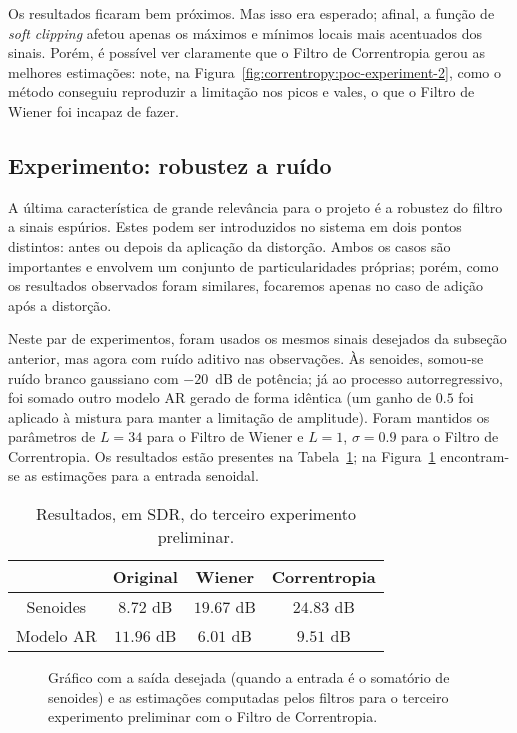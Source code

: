 Os resultados ficaram bem próximos. Mas isso era esperado; afinal, a função de \textit{soft clipping} afetou apenas os máximos e mínimos locais mais acentuados dos sinais. Porém, é possível ver claramente que o Filtro de Correntropia gerou as melhores estimações: note, na Figura~\ref{fig:correntropy:poc-experiment-2}, como o método conseguiu reproduzir a limitação nos picos e vales, o que o Filtro de Wiener foi incapaz de fazer.

\subsection{Experimento: robustez a ruído}

A última característica de grande relevância para o projeto é a robustez do filtro a sinais espúrios. Estes podem ser introduzidos no sistema em dois pontos distintos: antes ou depois da aplicação da distorção. Ambos os casos são importantes e envolvem um conjunto de particularidades próprias; porém, como os resultados observados foram similares, focaremos apenas no caso de adição após a distorção.

Neste par de experimentos, foram usados os mesmos sinais desejados da subseção anterior, mas agora com ruído aditivo nas observações. Às senoides, somou-se ruído branco gaussiano com $-20$~dB de potência; já ao processo autorregressivo, foi somado outro modelo AR gerado de forma idêntica (um ganho de $0.5$ foi aplicado à mistura para manter a limitação de amplitude). Foram mantidos os parâmetros de $L = 34$ para o Filtro de Wiener e $L = 1$, $\sigma = 0.9$ para o Filtro de Correntropia. Os resultados estão presentes na Tabela~\ref{tab:correntropy:poc-experiment-3}; na Figura~\ref{fig:correntropy:poc-experiment-3} encontram-se as estimações para a entrada senoidal.
{\def\arraystretch{1.25}\tabcolsep=10pt
\begin{table}[!ht]
    \centering
    \caption[Resultados do terceiro experimento preliminar: robustez a ruído]{Resultados, em SDR, do terceiro experimento preliminar.}
    \label{tab:correntropy:poc-experiment-3}
    \begin{tabular}{cccc}
        \toprule
                    & Original & Wiener    & Correntropia      \\ \midrule
        Senoides    & $8.72$ dB & $19.67$ dB    & $24.83$ dB    \\
        Modelo AR   & $11.96$ dB & $6.01$ dB    & $9.51$ dB    \\ \bottomrule
    \end{tabular}
\end{table}
}
\begin{figure}[!ht]
    \centering
    
    \caption[Saída desejada e estimações do terceiro experimento preliminar]{Gráfico com a saída desejada (quando a entrada é o somatório de senoides) e as estimações computadas pelos filtros para o terceiro experimento preliminar com o Filtro de Correntropia.}
    \label{fig:correntropy:poc-experiment-3}
\end{figure}

